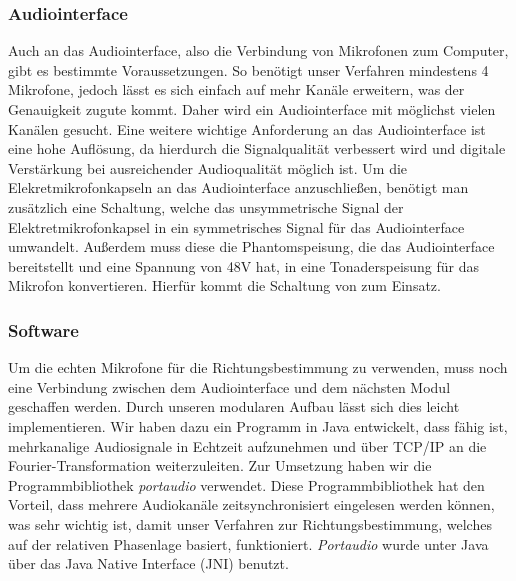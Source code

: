 \subsubsection{Audiointerface}
Auch an das Audiointerface, also die Verbindung von Mikrofonen zum Computer, gibt es bestimmte Voraussetzungen. So benötigt unser Verfahren mindestens 4 Mikrofone, jedoch lässt es sich einfach auf mehr Kanäle erweitern, was der Genauigkeit zugute kommt. Daher wird ein Audiointerface mit möglichst vielen Kanälen gesucht. Eine weitere wichtige Anforderung an das Audiointerface ist eine hohe Auflösung, da hierdurch die Signalqualität verbessert wird und digitale Verstärkung bei ausreichender Audioqualität möglich ist. Um die Elekretmikrofonkapseln an das Audiointerface anzuschließen, benötigt man zusätzlich eine Schaltung, welche das unsymmetrische Signal der Elektretmikrofonkapsel in ein symmetrisches Signal für das Audiointerface umwandelt. Außerdem muss diese die Phantomspeisung, die das Audiointerface bereitstellt und eine Spannung von 48V hat, in eine Tonaderspeisung für das Mikrofon konvertieren. Hierfür kommt die Schaltung von \cite{Powering_microphones} zum Einsatz.

\subsubsection{Software}
Um die echten Mikrofone für die Richtungsbestimmung zu verwenden, muss noch eine Verbindung zwischen dem Audiointerface und dem nächsten Modul geschaffen werden. Durch unseren modularen Aufbau lässt sich dies leicht implementieren. Wir haben dazu ein Programm in Java entwickelt, dass fähig ist, mehrkanalige Audiosignale in Echtzeit aufzunehmen und über TCP/IP an die Fourier-Transformation weiterzuleiten. Zur Umsetzung haben wir die Programmbibliothek \textit{portaudio} \cite{portaudio} verwendet. Diese Programmbibliothek hat den Vorteil, dass mehrere Audiokanäle zeitsynchronisiert eingelesen werden können, was sehr wichtig ist, damit unser Verfahren zur Richtungsbestimmung, welches auf der relativen Phasenlage basiert, funktioniert. \textit{Portaudio} wurde unter Java über das Java Native Interface (JNI) benutzt.

